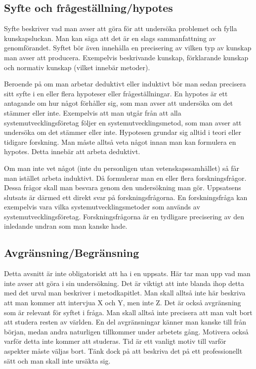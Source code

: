 \documentclass[a4paper,12pt]{article} %
\begin{document}
\subsection{Syfte och frågeställning/hypotes}
Syfte beskriver vad man avser att göra för att undersöka problemet och fylla kunskapsluckan. Man kan säga att det är en slags sammanfattning av genomförandet. Syftet bör även innehålla en precisering av vilken typ av kunskap man avser att producera. Exempelvis beskrivande kunskap, förklarande kunskap och normativ kunskap (vilket innebär metoder). 

Beroende på om man arbetar deduktivt eller induktivt bör man sedan precisera sitt syfte i en eller flera hypoteser eller frågeställningar. En hypotes är ett antagande om hur något förhåller sig, som man avser att undersöka om det stämmer eller inte. Exempelvis att man utgår från att alla systemutvecklingsföretag följer en systemutvecklingsmetod, som man avser att undersöka om det stämmer eller inte. Hypotesen grundar sig alltid i teori eller tidigare forskning. Man måste alltså veta något innan man kan formulera en hypotes. Detta innebär att arbeta deduktivt. 

Om man inte vet något (inte du personligen utan vetenskapssamhället) så får man istället arbeta induktivt. Då formulerar man en eller flera forskningsfrågor. Dessa frågor skall man besvara genom den undersökning man gör. Uppsatsens slutsats är därmed ett direkt svar på forskningsfrågorna. En forskningsfråga kan exempelvis vara vilka systemutvecklingsmetoder som används av systemutvecklingsföretag. Forskningsfrågorna är en tydligare precisering av den inledande undran som man kanske hade.

\subsection{Avgränsning/Begränsning}
Detta avsnitt är inte obligatoriskt att ha i en uppsats. Här tar man upp vad man inte avser att göra i sin undersökning. Det är viktigt att inte blanda ihop detta med det urval man beskriver i metodkapitlet. Man skall alltså inte här beskriva att man kommer att intervjua X och Y, men inte Z. Det är också avgränsning som är relevant för syftet i fråga. Man skall alltså inte precisera att man valt bort att studera resten av världen. En del avgränsningar känner man kanske till från början, medan andra naturligen tillkommer under arbetets gång. Motivera också varför detta inte kommer att studeras. Tid är ett vanligt motiv till varför aspekter måste väljas bort. Tänk dock på att beskriva det på ett professionellt sätt och man skall inte ursäkta sig. 
\end{document}
